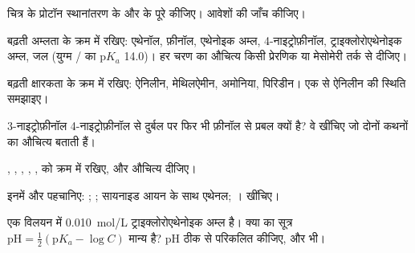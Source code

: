 \begin{exercise}[$\star$]\label{exo:b1:electronic-effects:4}
चित्र के प्रोटॉन स्थानांतरण के और
 के  पूरे कीजिए। आवेशों की जाँच कीजिए।
\end{exercise}

\begin{exercise}[$\star\star$]\label{exo:b1:electronic-effects:5}
बढ़ती अम्लता के क्रम में रखिए: एथेनॉल, फ़ीनॉल, एथेनोइक अम्ल,
4-नाइट्रोफ़ीनॉल, ट्राइक्लोरोएथेनोइक अम्ल, जल (युग्म / का $\mathrm{p}K_a$
14.0)। हर चरण का औचित्य किसी प्रेरणिक या
मेसोमेरी तर्क से दीजिए।
\end{exercise}

\begin{exercise}[$\star\star$]\label{exo:b1:electronic-effects:6}
बढ़ती क्षारकता के क्रम में रखिए: ऐनिलीन, मेथिलऐमीन, अमोनिया, पिरिडीन।
एक  से ऐनिलीन की स्थिति समझाइए।
\end{exercise}

\begin{exercise}[$\star\star$]\label{exo:b1:electronic-effects:7}
3-नाइट्रोफ़ीनॉल 4-नाइट्रोफ़ीनॉल से दुर्बल पर फिर भी फ़ीनॉल से प्रबल
क्यों है? वे  खींचिए जो दोनों कथनों का औचित्य बताती हैं।
\end{exercise}

\begin{exercise}[$\star\star$]\label{exo:b1:electronic-effects:8}
 , , ,
, ,  को क्रम में रखिए, और औचित्य दीजिए।
\end{exercise}

\begin{exercise}[$\star\star$]\label{exo:b1:electronic-effects:9}
इनमें  और  पहचानिए: ;
; सायनाइड आयन के साथ एथेनल; ।  खींचिए।
\end{exercise}

\begin{exercise}[$\star\star\star$]\label{exo:b1:electronic-effects:10}
एक विलयन में \qty{0.010}{mol/L} ट्राइक्लोरोएथेनोइक अम्ल है। क्या
 का सूत्र $\mathrm{pH} = \frac12(\mathrm{p}K_a - \log C)$ मान्य है?
pH ठीक से परिकलित कीजिए, और  भी।
\end{exercise}

